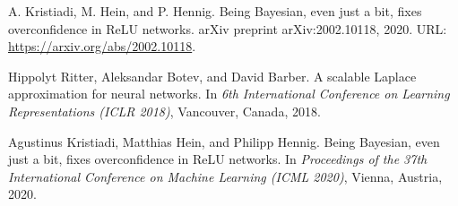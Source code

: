 \documentclass{article}
\begin{document}
\begin{thebibliography}{9}
A. Kristiadi, M. Hein, and P. Hennig.
\newblock Being Bayesian, even just a bit, fixes overconfidence in ReLU networks.
\newblock arXiv preprint arXiv:2002.10118, 2020.
\newblock URL: \url{https://arxiv.org/abs/2002.10118}.

Hippolyt Ritter, Aleksandar Botev, and David Barber.
\newblock A scalable Laplace approximation for neural networks.
\newblock In \emph{6th International Conference on Learning Representations (ICLR 2018)}, Vancouver, Canada, 2018.

Agustinus Kristiadi, Matthias Hein, and Philipp Hennig.
\newblock Being Bayesian, even just a bit, fixes overconfidence in ReLU networks.
\newblock In \emph{Proceedings of the 37th International Conference on Machine Learning (ICML 2020)}, Vienna, Austria, 2020.

\end{thebibliography}
\end{document}
